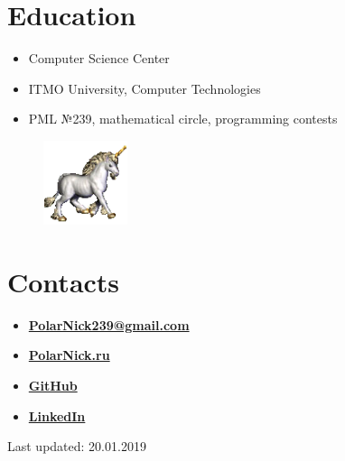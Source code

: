 \documentclass[11pt,oneside]{article}
\newcommand{\hhref}[2]{\href{#1}{\color{blue}#2}}
\begin{document}
\vspace{-9pt}
\section*{\textbf{Education}}
\vspace{-9pt}

\begin{itemize}
    \item{Computer Science Center}
    \item{ITMO University, Computer Technologies}
    \item{PML №239, mathematical circle, programming contests}
\end{itemize}

\begin{figure}
    \centering
    \includegraphics[width=0.22\textwidth]{unicorn.png}
\end{figure}

\vspace{-9pt}
\section*{\textbf{Contacts}}
\vspace{-9pt}

\begin{itemize}

    \item{\textbf{\hhref{mailto:PolarNick239@gmail.com}{PolarNick239@gmail.com}}}

    \item{\textbf{\hhref{http://polarnick239.github.io/index_ru.html}{PolarNick.ru}}}

    \item{\textbf{\hhref{https://github.com/PolarNick239}{GitHub}}}
    
    \item{\textbf{\hhref{https://www.linkedin.com/in/nickolay-polyarniy-61393b7b}{LinkedIn}}}
    
    
    
\end{itemize}

Last updated: 20.01.2019
\end{document}
